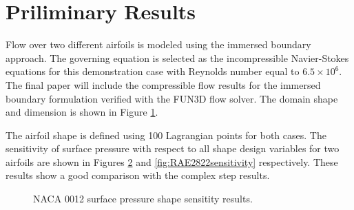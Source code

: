 \documentclass[12pt]{aiaa-pretty}
\begin{document}
\section{Priliminary Results}
Flow over two different airfoils is modeled using the immersed boundary approach. The governing equation is selected as the incompressible Navier-Stokes equations for this demonstration case with Reynolds number equal to $6.5 \times 10^6$. The final paper will include the compressible flow results for the immersed boundary formulation verified with the FUN3D flow solver. The domain shape and dimension is shown in Figure \ref{fig:physicalDomain}. 
%
\begin{figure}[H]
	\label{fig:physicalDomain}
\end{figure}
%
The airfoil shape is defined using 100 Lagrangian points for both cases. The sensitivity of surface pressure with respect to all shape design variables for two airfoils are shown in Figures \ref{fig:NACA0012sensitivity} and \ref{fig:RAE2822sensitivity} respectively. These results show a good comparison with the complex step results.
%
\begin{figure}[H]
	\centering
	\quad
	\caption{NACA 0012 surface pressure shape sensitity results.}
	\label{fig:NACA0012sensitivity}
\end{figure}
%
%
\end{document}
